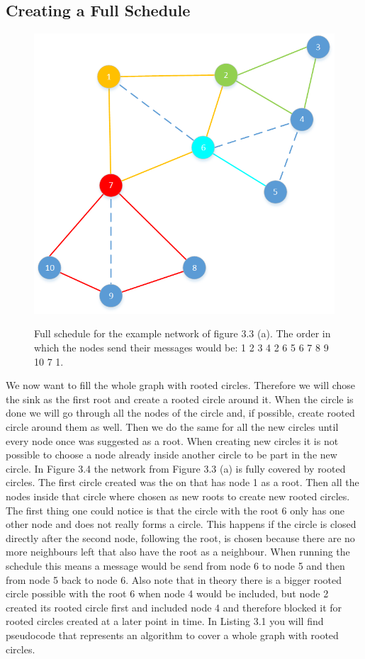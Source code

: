 \subsection{Creating a Full Schedule}
\begin{figure}[htbp]
	\centering         
    \includegraphics[scale=0.6]{content/images/Schedule/FullSchedule}
    \label{fig:link}
    \caption{Full schedule for the example network of figure 3.3 (a). The order in which the nodes send their messages would be: 1 2 3 4 2 6 5 6 7 8 9 10 7 1.}
\end{figure} 
We now want to fill the whole graph with rooted circles. Therefore we will chose the sink as the first root and create a rooted circle around it. When the circle is done we will go through all the nodes of the circle and, if possible, create rooted circle around them as well. Then we do the same for all the new circles until every node once was suggested as a root. When creating new circles it is not possible to choose a node already inside another circle to be part in the new circle. In Figure 3.4 the network from Figure 3.3 (a) is fully covered by rooted circles. The first circle created was the on that has node 1 as a root. Then all the nodes inside that circle where chosen as new roots to create new rooted circles. The first thing one could notice is that the circle with the root 6 only has one other node and does not really forms a circle. This happens if the circle is closed directly after the second node, following the root, is chosen because there are no more neighbours left that also have the root as a neighbour. When running the schedule this means a message would be send from node 6 to node 5 and then from node 5 back to node 6. Also note that in theory there is a bigger rooted circle possible with the root 6 when node 4 would be included, but node 2 created its rooted circle first and included node 4 and therefore blocked it for rooted circles created at a later point in time. In Listing 3.1 you will find pseudocode that represents an algorithm to cover a whole graph with rooted circles.


